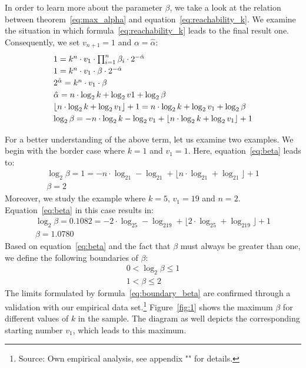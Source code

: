 \documentclass{SciPress_2015}
\begin{document}
\par\medskip
In order to learn more about the parameter $\beta$, we take a look at the relation between theorem~\ref{eq:max_alpha} and equation~\ref{eq:reachability_k}. We examine the situation in which formula~\ref{eq:reachability_k} leads to the final result one. Consequently, we set $v_{n+1}=1$ and $\alpha=\hat\alpha$:
\begin{equation}
\label{eq:beta}
\def\arraystretch{1.2}\begin{array}{l}
	1=k^n\cdot v_1\cdot\prod_{i=1}^{n}\beta_i\cdot2^{-\hat\alpha}\\
	1=k^n\cdot v_1\cdot\beta\cdot2^{-\hat\alpha}\\
	2^{\hat\alpha}=k^n\cdot v_1\cdot\beta\\
	\hat\alpha=n\cdot\log_2k+\log_2v1+\log_2\beta\\
	\lfloor n\cdot\log_2k+\log_2v_1\rfloor+1=n\cdot\log_2k+\log_2v_1+\log_2\beta\\
	\log_2\beta=-n\cdot\log_2k-\log_2v_1+\lfloor n\cdot\log_2k+\log_2v_1\rfloor+1
\end{array}
\end{equation}

\par\noindent
For a better understanding of the above term, let us examine two examples. We begin with the border case where $k=1$ and $v_1=1$. Here, equation~\ref{eq:beta} leads to:
\[
\begin{array}{c}
\log_2\beta=1=-n\cdot\log_21-\log_21+\lfloor n\cdot\log_21+\log_21\rfloor+1\\
\beta=2
\end{array}
\]
Moreover, we study the example where $k=5$, $v_1=19$ and $n=2$. Equation~\ref{eq:beta} in this case results in:
\[
\begin{array}{c}
\log_2\beta=0.1082=-2\cdot\log_25-\log_219+\lfloor 2\cdot\log_25+\log_219\rfloor+1\\
\beta=1.0780
\end{array}
\]
Based on equation~\ref{eq:beta} and the fact that $\beta$ must always be greater than one, we define the following boundaries of $\beta$:
\begin{equation}
\label{eq:boundary_beta}
\begin{array}{c}
0<\log_2\beta\le1\\
1<\beta\le2
\end{array}
\end{equation}
The limits formulated by formula~\ref{eq:boundary_beta} are confirmed through a validation with our empirical data set.\footnote{Source: Own empirical analysis, see appendix "" for details.} Figure~\ref{fig:1} shows the maximum $\beta$ for different values of $k$ in the sample. The diagram as well depicts the corresponding starting number $v_1$, which leads to this maximum.
\end{document}

